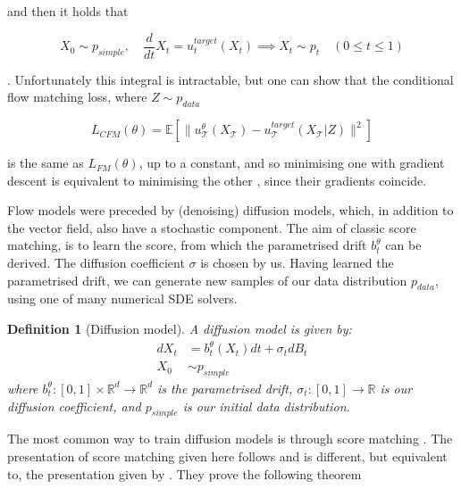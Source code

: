 \documentclass[12pt]{article}
\theoremstyle{break}
\newtheorem{definition}{Definition}[section]
\begin{document}
and then it holds that

\begin{equation*}
	X_0 \sim p_{simple}, \quad \frac{d}{dt}X_t = u_t^{target}(X_t) \implies X_t \sim p_t \quad (0 \leq t \leq 1)
\end{equation*}

\cite{lipman2024, holderrieth2025}. Unfortunately this integral is intractable, but one can show that the conditional flow matching loss, where $Z \sim p_{data}$

\begin{equation*}
	L_{CFM}(\theta) = \mathbb{E}[\| u_\mathcal{T}^{\theta}(X_\mathcal{T}) - u_\mathcal{T}^{target}(X_\mathcal{T}|Z)\|^2]
\end{equation*}

is the same as $L_{FM}(\theta)$, up to a constant, and so minimising one with gradient descent is equivalent to minimising the other \cite{lipman2024}, since their gradients coincide. 

Flow models were preceded by (denoising) diffusion models, which, in addition to the vector field, also have a stochastic component. The aim of classic score matching, is to learn the score, from which the parametrised drift $b_t^{\theta}$ can be derived. The diffusion coefficient $\sigma$ is chosen by us. Having learned the parametrised drift, we can generate new samples of our data distribution $p_{data}$, using one of many numerical SDE solvers. 

\begin{definition}[Diffusion model]
	A diffusion model is given by:
	\begin{align*}
		dX_t &= b_t^{\theta}(X_t)dt + \sigma_t d B_t \\
		X_0 &\sim p_{simple}
	\end{align*}
	where $b_t^{\theta}:[0,1] \times \mathbb{R}^d \to \mathbb{R}^d$ is the parametrised drift, $\sigma_t:[0,1] \to \mathbb{R}$ is our diffusion coefficient, and $p_{simple}$ is our initial data distribution.
\end{definition}

The most common way to train diffusion models is through score matching \cite{song2021}. The presentation of score matching given here follows \cite{holderrieth2025, lipman2024} and is different, but equivalent to, the presentation given by \cite{song2021}. They prove the following theorem
\end{document}
